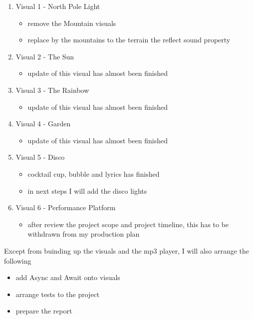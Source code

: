 \begin{enumerate}
  \item Visual 1 - North Pole Light
    \begin{itemize}
      \item remove the Mountain visuals
      \item replace by the mountains to the terrain the reflect sound property
    \end{itemize}
  \item Visual 2 - The Sun
    \begin{itemize}
      \item update of this visual has almost been finished
    \end{itemize}
  \item Visual 3 - The Rainbow
    \begin{itemize}
      \item update of this visual has almost been finished
    \end{itemize}
  \item Visual 4 - Garden
    \begin{itemize}
      \item update of this visual has almost been finished
    \end{itemize}
  \item Visual 5 - Disco
    \begin{itemize}
      \item cocktail cup, bubble and lyrics has finished
      \item in next steps I will add the disco lights
    \end{itemize}
  \item Visual 6 - Performance Platform
    \begin{itemize}
      \item after review the project scope and project timeline, this has to be withdrawn from my production plan
    \end{itemize}
\end{enumerate}

Except from buinding up the visuals and the mp3 player, I will also arrange the following

\begin{itemize}
  \item add Async and Await onto visuals
  \item arrange tests to the project
  \item prepare the report
\end{itemize}

